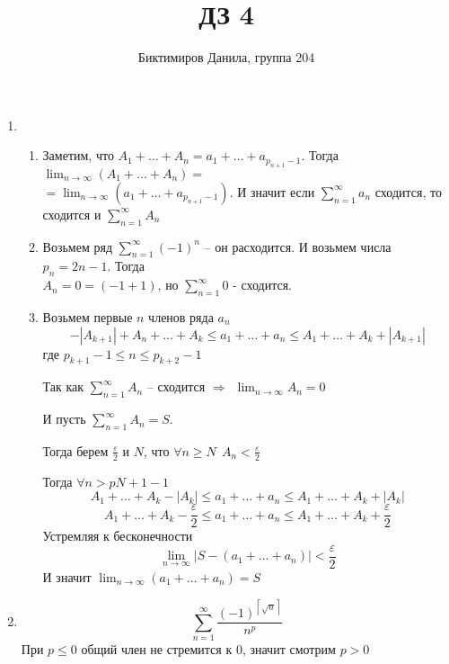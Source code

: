 \documentclass[11pt]{article}
\begin{document}
	
	\author{Биктимиров Данила, группа 204}
	\title{ДЗ 4}
	\date{}
	\maketitle
	
	\medskip
	
	\begin{enumerate}
		
		\item \begin{enumerate}
			\item Заметим, что $A_1 + \dots + A_n = a_1+\dots + a_{p_{n+1}-1}$. Тогда $\lim_{n\to \infty} \left(A_1 + \dots + A_n\right) =$\\ $= \lim_{n\to \infty} \left(a_1+\dots + a_{p_{n+1}-1}\right)$. И значит если $\sum_{n=1}^{\infty}a_n$ сходится, то сходится и $\sum_{n=1}^{\infty}A_n$

			\item Возьмем ряд $\sum_{n=1}^{\infty}(-1)^n$ -- он расходится. И возьмем числа $p_n=2n-1$. Тогда\\ $A_n=0=(-1+1)$, но $\sum_{n=1}^{\infty} 0 $ - сходится. 
			
			\item Возьмем первые $n$ членов ряда $a_n$
			$$-|A_{k+1}|+A_n+\dots +A_k\le a_1 + \dots + a_n \le A_1+\dots +A_k + |A_{k+1}|$$
			где $p_{k+1}-1\le n \le p_{k+2}-1$
			
			Так как $\sum_{n=1}^{\infty}A_n$ -- сходится $\Rightarrow \: \: \lim_{n\to \infty}A_n=0$
			
			И пусть $\sum_{n=1}^{\infty} A_n = S$.
			
			Тогда берем $\frac{\varepsilon}{2}$ и $N$, что $\forall n \ge N \:\: A_n<\frac{\varepsilon}{2}$
			
			Тогда $\forall n > p{N+1}-1$
			$$A_1+\dots +A_k-|A_k|\le a_1+\dots +a_n\le A_1+\dots +A_k +|A_k|$$
			$$A_1+\dots +A_k-\frac{\varepsilon}{2}\le a_1+\dots +a_n\le A_1+\dots +A_k +\frac{\varepsilon}{2}$$
			Устремляя к бесконечности
			$$\lim_{n\to \infty}|S-(a_1+\dots +a_n)|<\frac{\varepsilon}{2}$$
			И значит $\lim_{n\to \infty}(a_1+\dots +a_n)=S$
		\end{enumerate}
	
		\item $$\sum_{n=1}^{\infty}\frac{(-1)^{\left \lceil \sqrt{n} \right \rceil}}{n^p}$$
		При $p\le 0$ общий член не стремится к 0, значит смотрим $p>0$
		

\end{enumerate}
\end{document}
